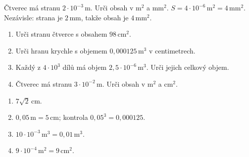 \documentclass[11pt,a4paper]{article}
\begin{document}

\begin{prikladReseniBox}[title={Rozšíření procvičení},breakable=false]
Čtverec má stranu $2\cdot10^{-3}\,\mathrm m$. Urči obsah v $\mathrm m^2$ a $\mathrm{mm}^2$.
\tcblower
$S=4\cdot10^{-6}\,\mathrm m^2=4\,\mathrm{mm}^2$. Nezávisle: strana je $2\,\mathrm{mm}$, takže obsah je $4\,\mathrm{mm}^2$.
\end{prikladReseniBox}





\begin{zadaniReseniBox}[title={Domácí úlohy},breakable=false]
\begin{enumerate}[label=\alph*)]
\item Urči stranu čtverce s obsahem $98\,\mathrm{cm}^2$.
\item Urči hranu krychle s objemem $0{,}000125\,\mathrm m^3$ v centimetrech.
\item Každý z $4\cdot10^3$ dílů má objem $2{,}5\cdot10^{-6}\,\mathrm m^3$. Urči jejich celkový objem.
\item Čtverec má stranu $3\cdot10^{-2}\,\mathrm m$. Urči obsah v $\mathrm m^2$ a $\mathrm{cm}^2$.
\end{enumerate}
\tcblower
\begin{enumerate}[label=\alph*)]
\item $7\sqrt2\,\mathrm{cm}$.
\item $0{,}05\,\mathrm m=5\,\mathrm{cm}$; kontrola $0{,}05^3=0{,}000125$.
\item $10\cdot10^{-3}\,\mathrm m^3=0{,}01\,\mathrm m^3$.
\item $9\cdot10^{-4}\,\mathrm m^2=9\,\mathrm{cm}^2$.
\end{enumerate}
\end{zadaniReseniBox}
\end{document}

